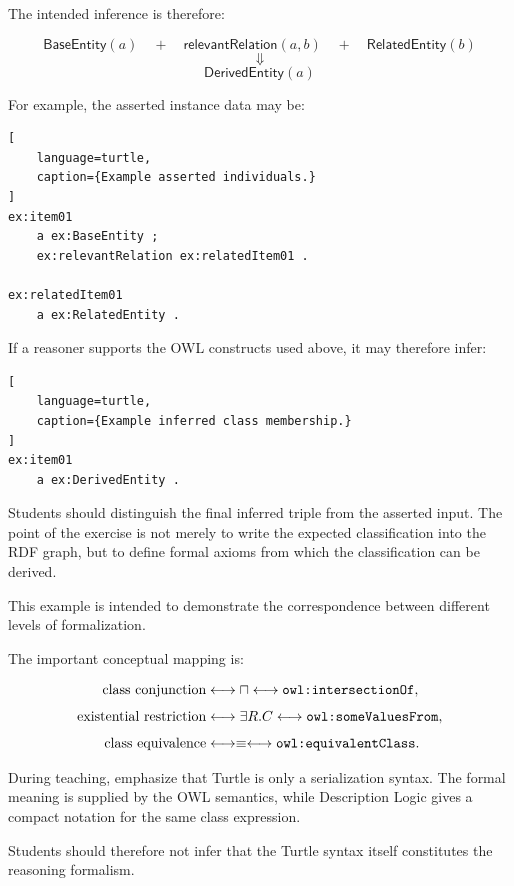 \documentclass[11pt]{article}
\newcommand{\code}[1]{\texttt{\detokenize{#1}}}
\begin{document}
The intended inference is therefore:

\[
\mathsf{BaseEntity}(a)
\quad+\quad
\mathsf{relevantRelation}(a,b)
\quad+\quad
\mathsf{RelatedEntity}(b)
\]
\[
\Downarrow
\]
\[
\boxed{
\mathsf{DerivedEntity}(a)
}
\]

For example, the asserted instance data may be:

\begin{lstlisting}[
    language=turtle,
    caption={Example asserted individuals.}
]
ex:item01
    a ex:BaseEntity ;
    ex:relevantRelation ex:relatedItem01 .

ex:relatedItem01
    a ex:RelatedEntity .
\end{lstlisting}

If a reasoner supports the OWL constructs used above, it may therefore infer:

\begin{lstlisting}[
    language=turtle,
    caption={Example inferred class membership.}
]
ex:item01
    a ex:DerivedEntity .
\end{lstlisting}

Students should distinguish the final inferred triple from the asserted input.
The point of the exercise is not merely to write the expected classification
into the RDF graph, but to define formal axioms from which the classification
can be derived.

\begin{tutornote}
This example is intended to demonstrate the correspondence between different
levels of formalization.

The important conceptual mapping is:

\[
\begin{aligned}
\text{class conjunction}
&\longleftrightarrow
\sqcap
\longleftrightarrow
\code{owl:intersectionOf},
\\[4pt]
\text{existential restriction}
&\longleftrightarrow
\exists R.C
\longleftrightarrow
\code{owl:someValuesFrom},
\\[4pt]
\text{class equivalence}
&\longleftrightarrow
\equiv
\longleftrightarrow
\code{owl:equivalentClass}.
\end{aligned}
\]

During teaching, emphasize that Turtle is only a serialization syntax. The
formal meaning is supplied by the OWL semantics, while Description Logic gives
a compact notation for the same class expression.

Students should therefore not infer that the Turtle syntax itself constitutes
the reasoning formalism.
\end{tutornote}
\end{document}
